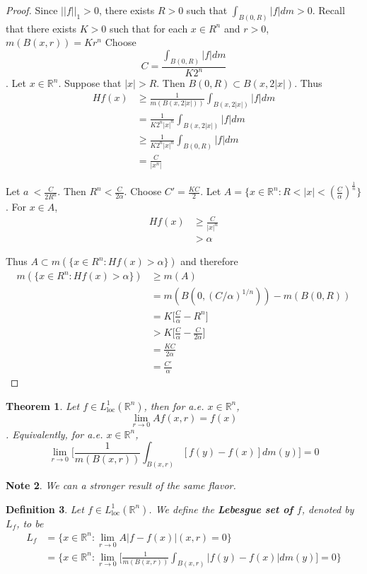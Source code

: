 \documentclass[12pt]{amsart}
\newtheorem{thm}{Theorem}[section]
\newtheorem{defn}[thm]{Definition}
\newtheorem{note}[thm]{Note}
\newcommand{\al}{\alpha}
\newcommand{\R}{\mathbb{R}}
\newcommand{\Ll}{L^1_{\text{loc}}(\R^n)}
\begin{document}
\begin{proof}
Since $||f||_1 >0$, there exists $R>0$ such that $\int_{B(0,R)}|f|dm >0$. Recall that there exists $K>0$ such that for each $x \in R^n$ and $r>0$, $m(B(x,r)) = Kr^n$ Choose $$C = \frac{\int_{B(0,R)}|f|dm}{K2^n}$$. Let $x \in \R^n$. Suppose that $|x|>R$. Then $B(0,R) \subset B(x,2|x|)$. Thus 
\begin{align*}
Hf(x) 
&\geq \frac{1}{m(B(x,2|x|))}\int_{B(x,2|x|)}|f|dm\\
&= \frac{1}{K2^n|x|^n}\int_{B(x,2|x|)}|f|dm \\
&\geq \frac{1}{K2^n|x|^n}\int_{B(0,R)}|f|dm \\
&= \frac{C}{|x^n|}
\end{align*}

Let $a\ < \frac{C}{2R^n}$. Then $R^n < \frac{C}{2 \al}$. Choose $C' =\frac{KC}{2}$. Let $A = \{x \in \R^n: R < |x|< (\frac{C}{\al})^{\frac{1}{n}}\}$. For $x \in A$, 
\begin{align*}
Hf(x) 
&\geq \frac{C}{|x|^n} \\
& > \al
\end{align*}

Thus $A \subset m(\{x \in R^n: Hf(x)> \al\})$ and therefore 
\begin{align*}
m(\{x \in R^n: Hf(x)> \al\}) 
&\geq m(A) \\
&= m(B(0,(C/\al)^{1/n})) - m(B(0,R)) \\
&= K\bigg [\frac{C}{\al} - R^n \bigg] \\
&> K\bigg[\frac{C}{\al} - \frac{C}{2 \al}\bigg] \\
&= \frac{KC}{2 \al}\\
&= \frac{C'}{\al}
\end{align*}
\end{proof}

\begin{thm}
Let $f \in \Ll$, then for a.e. $x \in \R^n$, $$\lim_{r \rightarrow 0} Af(x,r) =f(x)$$. Equivalently, for a.e. $x \in \R^n$, $$ \lim_{r \rightarrow 0} \bigg[ \frac{1}{m(B(x,r))}\int_{B(x,r)}[f(y)-f(x)]dm(y)\bigg] =0$$
\end{thm}

\begin{note}
We can a stronger result of the same flavor.
\end{note}

\begin{defn}
Let $f \in \Ll$. We define the \textbf{Lebesgue set of $f$}, denoted by $L_f$, to be 
\begin{align*}
L_f 
&= \{x \in \R^n: \lim_{r \rightarrow 0} A|f-f(x)|(x,r) =0 \}\\
&= \bigg \{x \in \R^n: \lim_{r \rightarrow 0} \bigg[ \frac{1}{m(B(x,r))}\int_{B(x,r)}|f(y) - f(x)|dm(y)\bigg] =0 \bigg \}
\end{align*}
\end{defn}
\end{document}
